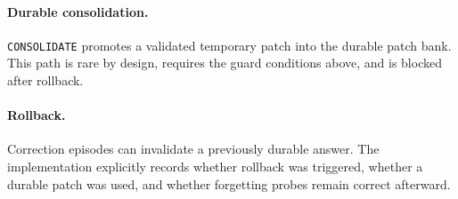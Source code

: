 \paragraph{Durable consolidation.}
\texttt{CONSOLIDATE} promotes a validated temporary patch into the durable patch bank. This path is rare by design, requires the guard conditions above, and is blocked after rollback.

\paragraph{Rollback.}
Correction episodes can invalidate a previously durable answer. The implementation explicitly records whether rollback was triggered, whether a durable patch was used, and whether forgetting probes remain correct afterward.
